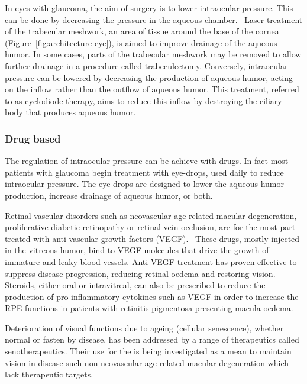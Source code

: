 \documentclass[12pt,a4paper]{journal}
\begin{document}
In eyes with glaucoma, the aim of surgery is to lower intraocular pressure.
This can be done by decreasing the pressure in the aqueous chamber.~\cite{Quigley_2011}
Laser treatment of the trabecular meshwork, an area of tissue around the base of the cornea (Figure~\ref{fig:architecture-eye}), is aimed to improve drainage of the aqueous humor.
In some cases, parts of the trabecular meshwork may be removed to allow further drainage in a procedure called trabeculectomy.
Conversely, intraocular pressure can be lowered by decreasing the production of aqueous humor, acting on the inflow rather than the outflow of aqueous humor.
This treatment, referred to as cyclodiode therapy, aims to reduce this inflow by destroying the ciliary body that produces aqueous humor.~\cite{Allbon_2022}

\subsubsection*{Drug based}

The regulation of intraocular pressure can be achieve with drugs.
In fact most patients with glaucoma begin treatment with eye-drops, used daily to reduce intraocular pressure.
The eye-drops are designed to lower the aqueous humor production, increase drainage of aqueous humor, or both.~\cite{Chakrabarti_2022,Quigley_2011}

Retinal vascular disorders such as neovascular age-related macular degeneration, proliferative diabetic retinopathy or retinal vein occlusion, are for the most part treated with anti vascular growth factors (VEGF).~\cite{Andreoli_2007,Kim_2021}
These drugs, mostly injected in the vitreous humor, bind to VEGF molecules that drive the growth of immature and leaky blood vessels.
Anti-VEGF treatment has proven effective to suppress disease progression, reducing retinal oedema and restoring vision.~\cite{Andreoli_2007,Heier_2006,Kim_2021}
Steroids, either oral or intravitreal, can also be prescribed to reduce the production of pro-inflammatory cytokines such as VEGF in order to increase the RPE functions in patients with retinitis pigmentosa presenting macula oedema.~\cite{Strong_2016}

Deterioration of visual functions due to ageing (cellular senescence), whether normal or fasten by disease, has been addressed by a range of therapeutics called senotherapeutics.
Their use for the is being investigated as a mean to maintain vision in disease such non-neovascular age-related macular degeneration which lack therapeutic targets.~\cite{Lee_2021}
\end{document}
